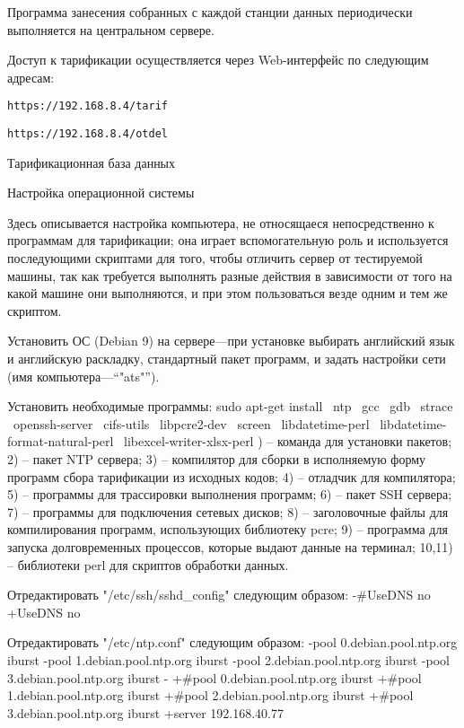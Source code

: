 \noindent
Программа занесения собранных с каждой станции данных периодически выполняется на центральном сервере.

\noindent
Доступ к тарификации осуществляется через Web-интерфейс по следующим адресам:
\item{} {\tt https://192.168.8.4/tarif} 
\item{} {\tt https://192.168.8.4/otdel} 

\vfill
\eject
\sec Тарификационная база данных

\subsec Настройка операционной системы

\medskip

Здесь описывается настройка компьютера, не относящаеся непосредственно к программам для тарификации; она играет вспомогательную
роль и используется последующими скриптами для того, чтобы отличить сервер от тестируемой машины, так как требуется выполнять
разные действия в зависимости от того на какой машине они выполняются, и при этом пользоваться везде одним и тем же скриптом.
\smallskip

\N
Установить ОС (Debian 9) на сервере---при установке выбирать английский язык и английскую
раскладку,
стандартный пакет программ, и задать настройки сети (имя компьютера---``"ats"'').

\noindent Установить необходимые программы:
\begintt
sudo apt-get install \
  ntp \
  gcc \
  gdb \
  strace \
  openssh-server \
  cifs-utils \
  libpcre2-dev \
  screen \
  libdatetime-perl \
  libdatetime-format-natural-perl \
  libexcel-writer-xlsx-perl
\endtt
\baselineskip=9pt\rmsmall
\noindent
1) -- команда для установки пакетов;
2) -- пакет NTP сервера;
3) -- компилятор для сборки в исполняемую форму программ сбора тарификации из исходных кодов;
4) -- отладчик для компилятора;
5) -- программы для трассировки выполнения программ;
6) -- пакет SSH сервера;
7) -- программы для подключения сетевых дисков;
8) -- заголовочные файлы для компилирования программ, использующих библиотеку {\slsmall pcre\/};
9) -- программа для запуска долговременных процессов, которые выдают данные на терминал;
10,11) -- библиотеки {\slsmall perl\/} для скриптов обработки данных.
\par\normalbaselines\rm
\medskip

\noindent Отредактировать "/etc/ssh/sshd_config" следующим образом:
\begtt
-#UseDNS no
+UseDNS no
\endtt
\medskip

\noindent Отредактировать "/etc/ntp.conf" следующим образом:
\begtt
-pool 0.debian.pool.ntp.org iburst
-pool 1.debian.pool.ntp.org iburst
-pool 2.debian.pool.ntp.org iburst
-pool 3.debian.pool.ntp.org iburst
-
+#pool 0.debian.pool.ntp.org iburst
+#pool 1.debian.pool.ntp.org iburst
+#pool 2.debian.pool.ntp.org iburst
+#pool 3.debian.pool.ntp.org iburst
+server 192.168.40.77
\endtt
\medskip

